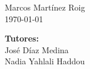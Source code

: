 \begin{titlepage}
\begin{center}
\begin{large}
Marcos Martínez Roig\\
\today
\end{large}
\end{center}

\begin{large}
\begin{flushright}
\item[\bf Tutores:\hspace{4cm} ]\quad  \\ José Díaz Medina\\
Nadia Yahlali Haddou\\
\end{flushright}
\end{large}

\end{titlepage}
